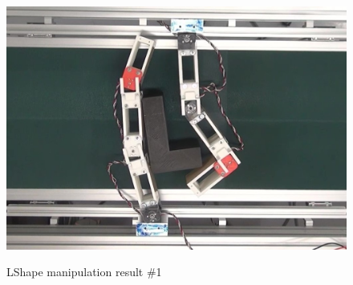 \documentclass[a4paper,twoside,12pt,papersize, dvipdfmx]{iirthesis}
\begin{document}
\begin{figure}[b]
\begin{minipage}{0.249\hsize}
\subcaption{}\label{}
\end{minipage}\hfill
\begin{minipage}{0.249\hsize}
\centering
\includegraphics[width=0.98\hsize]{fig/4-manipulation-result/LShape/1-4.jpg}
\subcaption{}\label{}
\end{minipage}
\caption{LShape manipulation result \#1}\label{fig::result::lm1}


\end{figure}
\end{document}
